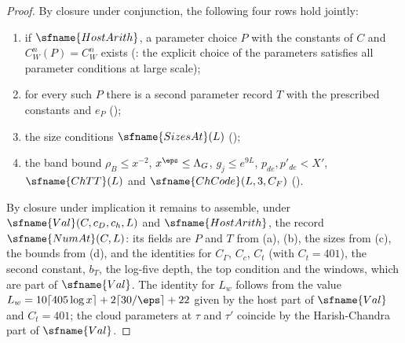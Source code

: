 \begin{proof}
By closure under conjunction, the following four rows hold jointly:
\begin{enumerate}[label=(\alph*)]
\item if $\sfname{HostArith}$, a parameter choice $P$ with the constants of $C$ and $C^n_W(P)=C^n_W$ exists
(: the explicit choice of the parameters satisfies all
parameter conditions at large scale);
\item for every such $P$ there is a second parameter record $T$ with the prescribed constants and $e_P$
();
\item the size conditions $\sfname{SizesAt}(L)$ ();
\item the band bound $\rho_B\le x^{-2}$, $x^\eps\le\Lambda_G$, $g_j\le e^{9L}$, $p_{de},p'_{de}<X'$, $\sfname{ChTT}(L)$ and
$\sfname{ChCode}(L,3,C_F)$ ().
\end{enumerate}
By closure under implication it remains to assemble, under $\sfname{Val}(C,c_D,c_h,L)$ and $\sfname{HostArith}$, the record
$\sfname{NumAt}(C,L)$: its fields are $P$ and $T$ from (a), (b), the sizes from (c), the bounds from (d), and the identities for $C_\Gamma$,
$C_c$, $C_t$ (with $C_t=401$), the second constant, $b_T$, the log-five depth, the top condition and the windows, which are part of
$\sfname{Val}$. The identity for $L_w$ follows from the value $L_w=10\lceil405\log x\rceil+2\lceil30/\eps\rceil+22$ given by the host part of
$\sfname{Val}$ and $C_t=401$; the cloud parameters at $\tau$ and $\tau'$ coincide by the Harish-Chandra part of $\sfname{Val}$.
\end{proof}

